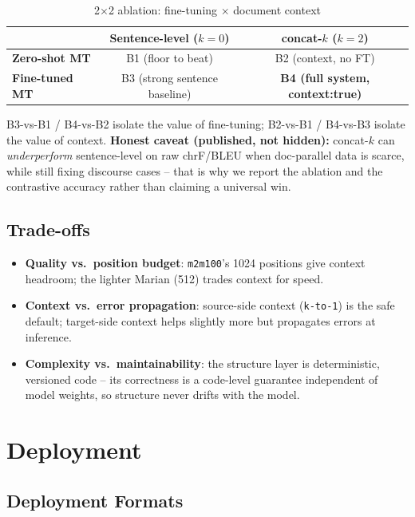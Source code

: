 \documentclass[12pt,a4paper]{article}
\begin{document}
\begin{table}[H]
\centering
\caption{2$\times$2 ablation: fine-tuning $\times$ document context}
\begin{tabular}{lcc}
\toprule
 & \textbf{Sentence-level ($k=0$)} & \textbf{concat-$k$ ($k=2$)} \\
\midrule
\textbf{Zero-shot MT} & B1 (floor to beat) & B2 (context, no FT) \\
\textbf{Fine-tuned MT} & B3 (strong sentence baseline) & \textbf{B4 (full system, context:true)} \\
\bottomrule
\end{tabular}
\end{table}

B3-vs-B1 / B4-vs-B2 isolate the value of fine-tuning; B2-vs-B1 / B4-vs-B3 isolate the value of context. \textbf{Honest caveat (published, not hidden):} concat-$k$ can \emph{underperform} sentence-level on raw chrF/BLEU when doc-parallel data is scarce, while still fixing discourse cases -- that is why we report the ablation and the contrastive accuracy rather than claiming a universal win.

\subsection{Trade-offs}

\begin{itemize}
  \item \textbf{Quality vs.\ position budget}: \texttt{m2m100}'s 1024 positions give context headroom; the lighter Marian (512) trades context for speed.
  \item \textbf{Context vs.\ error propagation}: source-side context (\texttt{k-to-1}) is the safe default; target-side context helps slightly more but propagates errors at inference.
  \item \textbf{Complexity vs.\ maintainability}: the structure layer is deterministic, versioned code -- its correctness is a code-level guarantee independent of model weights, so structure never drifts with the model.
\end{itemize}

\section{Deployment}

\subsection{Deployment Formats}
\end{document}
